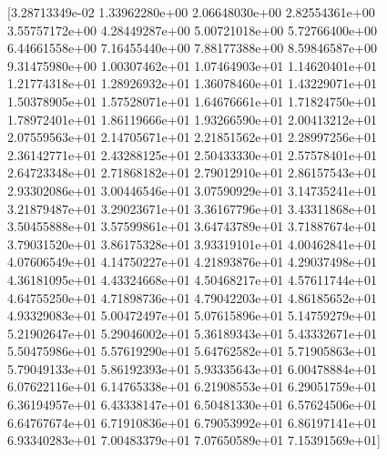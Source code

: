 \documentclass{article}
\begin{document}
[3.28713349e-02 1.33962280e+00 2.06648030e+00 2.82554361e+00 \\
 3.55757172e+00 4.28449287e+00 5.00721018e+00 5.72766400e+00 \\
 6.44661558e+00 7.16455440e+00 7.88177388e+00 8.59846587e+00 \\
 9.31475980e+00 1.00307462e+01 1.07464903e+01 1.14620401e+01 \\
 1.21774318e+01 1.28926932e+01 1.36078460e+01 1.43229071e+01 \\
 1.50378905e+01 1.57528071e+01 1.64676661e+01 1.71824750e+01 \\
 1.78972401e+01 1.86119666e+01 1.93266590e+01 2.00413212e+01 \\
 2.07559563e+01 2.14705671e+01 2.21851562e+01 2.28997256e+01 \\
 2.36142771e+01 2.43288125e+01 2.50433330e+01 2.57578401e+01 \\
 2.64723348e+01 2.71868182e+01 2.79012910e+01 2.86157543e+01 \\
 2.93302086e+01 3.00446546e+01 3.07590929e+01 3.14735241e+01 \\
 3.21879487e+01 3.29023671e+01 3.36167796e+01 3.43311868e+01 \\
 3.50455888e+01 3.57599861e+01 3.64743789e+01 3.71887674e+01 \\
 3.79031520e+01 3.86175328e+01 3.93319101e+01 4.00462841e+01 \\
 4.07606549e+01 4.14750227e+01 4.21893876e+01 4.29037498e+01 \\
 4.36181095e+01 4.43324668e+01 4.50468217e+01 4.57611744e+01 \\
 4.64755250e+01 4.71898736e+01 4.79042203e+01 4.86185652e+01 \\
 4.93329083e+01 5.00472497e+01 5.07615896e+01 5.14759279e+01 \\
 5.21902647e+01 5.29046002e+01 5.36189343e+01 5.43332671e+01 \\
 5.50475986e+01 5.57619290e+01 5.64762582e+01 5.71905863e+01 \\
 5.79049133e+01 5.86192393e+01 5.93335643e+01 6.00478884e+01 \\
 6.07622116e+01 6.14765338e+01 6.21908553e+01 6.29051759e+01 \\
 6.36194957e+01 6.43338147e+01 6.50481330e+01 6.57624506e+01 \\
 6.64767674e+01 6.71910836e+01 6.79053992e+01 6.86197141e+01 \\
 6.93340283e+01 7.00483379e+01 7.07650589e+01 7.15391569e+01] 
\end{document}
